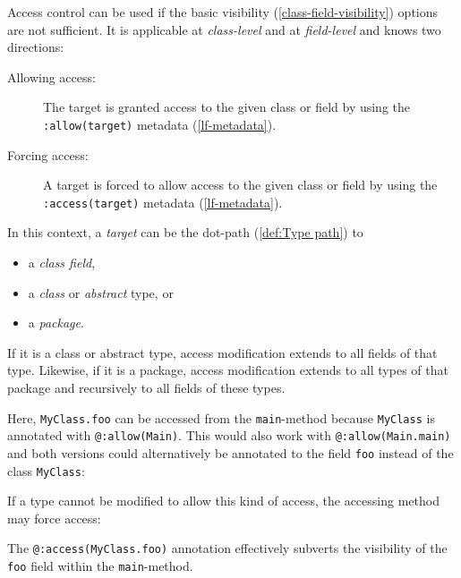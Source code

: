 \documentclass[a4paper,oneside]{book}
\newcommand{\type}[1]{\texttt{#1}}
\newcommand{\expr}[1]{\texttt{#1}}
\newcommand{\tref}[2]{#1 (\ref{#2})}
\newcommand{\haxe}[2][]{%
}
\begin{document}
Access control can be used if the basic \tref{visibility}{class-field-visibility} options are not sufficient. It is applicable at \emph{class-level} and at \emph{field-level} and knows two directions:

\begin{description}
	\item[Allowing access:] The target is granted access to the given class or field by using the \expr{:allow(target)} \tref{metadata}{lf-metadata}.
	\item[Forcing access:] A target is forced to allow access to the given class or field by using the \expr{:access(target)} \tref{metadata}{lf-metadata}.
\end{description}

In this context, a \emph{target} can be the \tref{dot-path}{def:Type path} to

\begin{itemize}
	\item a \emph{class field},
	\item a \emph{class} or \emph{abstract} type, or
	\item a \emph{package}.
\end{itemize}

If it is a class or abstract type, access modification extends to all fields of that type. Likewise, if it is a package, access modification extends to all types of that package and recursively to all fields of these types.

\haxe{assets/ACL.hx}

Here, \expr{MyClass.foo} can be accessed from the \expr{main}-method because \type{MyClass} is annotated with \expr{@:allow(Main)}. This would also work with \expr{@:allow(Main.main)} and both versions could alternatively be annotated to the field \expr{foo} instead of the class \type{MyClass}:

\haxe{assets/ACL2.hx}

If a type cannot be modified to allow this kind of access, the accessing method may force access:

\haxe{assets/ACL3.hx}

The \expr{@:access(MyClass.foo)} annotation effectively subverts the visibility of the \expr{foo} field within the \expr{main}-method. 
\end{document}
